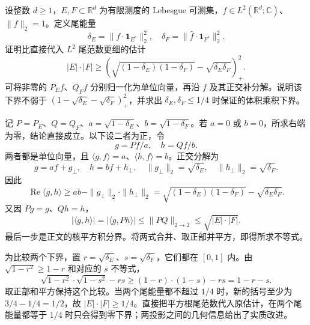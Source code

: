 \begin{optionalexercise}\label{b2:ex:20-new-7}
设整数 \(d\geq1\)，\(E,F\subset\mathbb R^d\) 为有限测度的 Lebesgue 可测集，\(f\in L^2(\mathbb R^d;\mathbb C)\)、\(\|f\|_2=1\)。定义尾能量
\[
 \delta_E=\|f\cdot\mathbf1_{E^c}\|_2^2,
 \quad\delta_F=\|\widehat f\cdot\mathbf1_{F^c}\|_2^2.
\]
证明比直接代入 \(L^2\) 尾范数更细的估计
\[
 |E|\cdot|F|\geq
 \left(\sqrt{(1-\delta_E)(1-\delta_F)}
                        -\sqrt{\delta_E\delta_F}\right)_+^2.
\]
可将非零的 \(P_Ef\)、\(Q_Ff\) 分别归一化为单位向量，再沿 \(f\) 及其正交补分解。说明该下界不弱于
\((1-\sqrt{\delta_E}-\sqrt{\delta_F})_+^2\)，并求出 \(\delta_E,\delta_F\leq1/4\) 时保证的体积乘积下界。
\end{optionalexercise}
\begin{solution}
记 \(P=P_E\)、\(Q=Q_F\)、\(a=\sqrt{1-\delta_E}\)、\(b=\sqrt{1-\delta_F}\)。若 \(a=0\) 或 \(b=0\)，所求右端为零，结论直接成立。以下设二者为正，令
\[
 g=Pf/a,\quad h=Qf/b.
\]
两者都是单位向量，且 \(\langle g,f\rangle=a\)、\(\langle h,f\rangle=b\)。正交分解为
\[
 g=af+g_\perp,\quad h=bf+h_\perp,
 \quad \|g_\perp\|_2=\sqrt{\delta_E},
 \quad \|h_\perp\|_2=\sqrt{\delta_F}.
\]
因此
\[
 \operatorname{Re}\langle g,h\rangle
 \geq ab-\|g_\perp\|_2\cdot\|h_\perp\|_2
 =\sqrt{(1-\delta_E)(1-\delta_F)}
                         -\sqrt{\delta_E\delta_F}.
\]
又因 \(Pg=g\)、\(Qh=h\)，
\[
 |\langle g,h\rangle|=|\langle g,Ph\rangle|
 \leq\|PQ\|_{2\to2}
 \leq\sqrt{|E|\cdot|F|}.
\]
最后一步是正文的核平方积分界。将两式合并、取正部并平方，即得所求不等式。

为比较两个下界，置 \(r=\sqrt{\delta_E}\)、\(s=\sqrt{\delta_F}\)，它们都在 \([0,1]\) 内。由 \(\sqrt{1-r^2}\geq1-r\) 和对应的 \(s\) 不等式，
\[
 \sqrt{1-r^2}\cdot\sqrt{1-s^2}-rs
 \geq(1-r)\cdot(1-s)-rs=1-r-s.
\]
取正部和平方保持这个比较。当两个尾能量都不超过 \(1/4\) 时，新的括号至少为 \(3/4-1/4=1/2\)，故
\(|E|\cdot|F|\geq1/4\)。直接把平方根尾范数代入原估计，在两个尾能量都等于 \(1/4\) 时只会得到零下界；两投影之间的几何信息给出了实质改进。
\end{solution}

